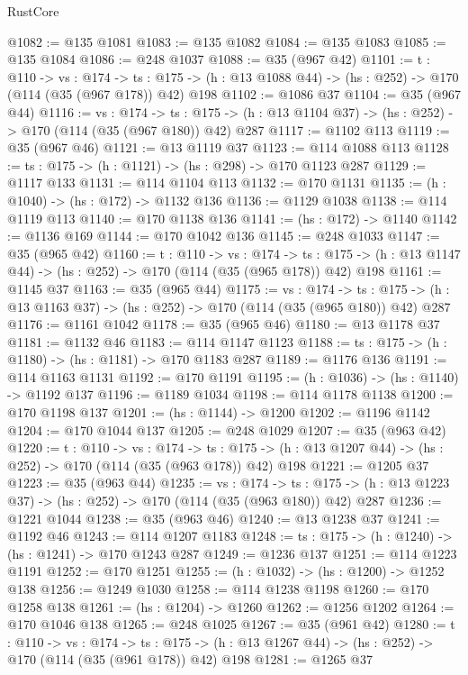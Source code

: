 \begin{lexlean}{RustCore}
\begin{coremodule}
@1082 := @135 @1081
@1083 := @135 @1082
@1084 := @135 @1083
@1085 := @135 @1084
@1086 := @248 @1037
@1088 := @35 (@967 @42)
@1101 := {t : @110} ->
  {vs : @174} ->
  {ts : @175} -> (h : @13 @1088 @44) -> (hs : @252) -> @170 (@114 (@35 (@967 @178)) @42) @198
@1102 := @1086 @37
@1104 := @35 (@967 @44)
@1116 := {vs : @174} ->
  {ts : @175} -> (h : @13 @1104 @37) -> (hs : @252) -> @170 (@114 (@35 (@967 @180)) @42) @287
@1117 := @1102 @113
@1119 := @35 (@967 @46)
@1121 := @13 @1119 @37
@1123 := @114 @1088 @113
@1128 := {ts : @175} -> (h : @1121) -> (hs : @298) -> @170 @1123 @287
@1129 := @1117 @133
@1131 := @114 @1104 @113
@1132 := @170 @1131
@1135 := (h : @1040) -> (hs : @172) -> @1132 @136
@1136 := @1129 @1038
@1138 := @114 @1119 @113
@1140 := @170 @1138 @136
@1141 := (hs : @172) -> @1140
@1142 := @1136 @169
@1144 := @170 @1042 @136
@1145 := @248 @1033
@1147 := @35 (@965 @42)
@1160 := {t : @110} ->
  {vs : @174} ->
  {ts : @175} -> (h : @13 @1147 @44) -> (hs : @252) -> @170 (@114 (@35 (@965 @178)) @42) @198
@1161 := @1145 @37
@1163 := @35 (@965 @44)
@1175 := {vs : @174} ->
  {ts : @175} -> (h : @13 @1163 @37) -> (hs : @252) -> @170 (@114 (@35 (@965 @180)) @42) @287
@1176 := @1161 @1042
@1178 := @35 (@965 @46)
@1180 := @13 @1178 @37
@1181 := @1132 @46
@1183 := @114 @1147 @1123
@1188 := {ts : @175} -> (h : @1180) -> (hs : @1181) -> @170 @1183 @287
@1189 := @1176 @136
@1191 := @114 @1163 @1131
@1192 := @170 @1191
@1195 := (h : @1036) -> (hs : @1140) -> @1192 @137
@1196 := @1189 @1034
@1198 := @114 @1178 @1138
@1200 := @170 @1198 @137
@1201 := (hs : @1144) -> @1200
@1202 := @1196 @1142
@1204 := @170 @1044 @137
@1205 := @248 @1029
@1207 := @35 (@963 @42)
@1220 := {t : @110} ->
  {vs : @174} ->
  {ts : @175} -> (h : @13 @1207 @44) -> (hs : @252) -> @170 (@114 (@35 (@963 @178)) @42) @198
@1221 := @1205 @37
@1223 := @35 (@963 @44)
@1235 := {vs : @174} ->
  {ts : @175} -> (h : @13 @1223 @37) -> (hs : @252) -> @170 (@114 (@35 (@963 @180)) @42) @287
@1236 := @1221 @1044
@1238 := @35 (@963 @46)
@1240 := @13 @1238 @37
@1241 := @1192 @46
@1243 := @114 @1207 @1183
@1248 := {ts : @175} -> (h : @1240) -> (hs : @1241) -> @170 @1243 @287
@1249 := @1236 @137
@1251 := @114 @1223 @1191
@1252 := @170 @1251
@1255 := (h : @1032) -> (hs : @1200) -> @1252 @138
@1256 := @1249 @1030
@1258 := @114 @1238 @1198
@1260 := @170 @1258 @138
@1261 := (hs : @1204) -> @1260
@1262 := @1256 @1202
@1264 := @170 @1046 @138
@1265 := @248 @1025
@1267 := @35 (@961 @42)
@1280 := {t : @110} ->
  {vs : @174} ->
  {ts : @175} -> (h : @13 @1267 @44) -> (hs : @252) -> @170 (@114 (@35 (@961 @178)) @42) @198
@1281 := @1265 @37

\end{coremodule}
\end{lexlean}

